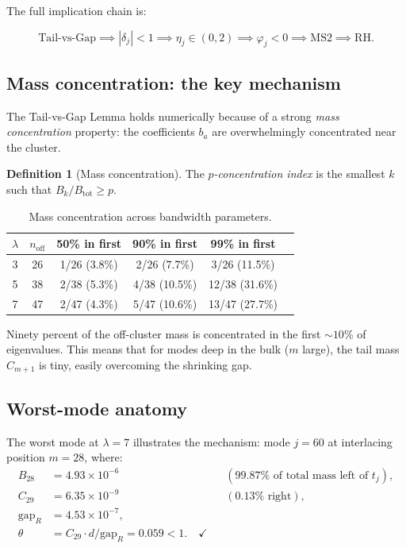\documentclass[12pt,a4paper]{article}
\theoremstyle{definition}
\newtheorem{definition}[theorem]{Definition}
\theoremstyle{remark}
\newcommand{\off}{\mathrm{off}}
\begin{document}
The full implication chain is:

\begin{equation}
\label{eq:chain}
\boxed{
\text{Tail-vs-Gap}
\!\implies\! |\delta_j| < 1
\!\implies\! \eta_j \in (0,2)
\!\implies\! \varphi_j < 0
\!\implies\! \text{MS2}
\!\implies\! \text{RH}.
}
\end{equation}

\subsection{Mass concentration: the key mechanism}

The Tail-vs-Gap Lemma holds numerically because of a strong
\emph{mass concentration} property: the coefficients $b_a$ are
overwhelmingly concentrated near the cluster.

\begin{definition}[Mass concentration]
The \emph{$p$-concentration index} is the smallest $k$ such that
$B_k / B_{\mathrm{tot}} \geq p$.
\end{definition}

\begin{table}[h]
\centering
\caption{Mass concentration across bandwidth parameters.}
\label{tab:mass}
\begin{tabular}{cccccc}
\toprule
$\lambda$ & $n_{\off}$ & 50\% in first & 90\% in first & 99\% in first \\
\midrule
3 & 26 & 1/26 (3.8\%) & 2/26 (7.7\%) & 3/26 (11.5\%) \\
5 & 38 & 2/38 (5.3\%) & 4/38 (10.5\%) & 12/38 (31.6\%) \\
7 & 47 & 2/47 (4.3\%) & 5/47 (10.6\%) & 13/47 (27.7\%) \\
\bottomrule
\end{tabular}
\end{table}

Ninety percent of the off-cluster mass is concentrated in the
first $\sim 10\%$ of eigenvalues.
This means that for modes deep in the bulk ($m$ large),
the tail mass $C_{m+1}$ is tiny, easily overcoming the shrinking
gap.

\subsection{Worst-mode anatomy}

The worst mode at $\lambda = 7$ illustrates the mechanism:
mode $j = 60$ at interlacing position $m = 28$, where:
\begin{align*}
B_{28} &= 4.93 \times 10^{-6} && (99.87\% \text{ of total mass left of } t_j), \\
C_{29} &= 6.35 \times 10^{-9} && (0.13\% \text{ right}), \\
\text{gap}_R &= 4.53 \times 10^{-7}, \\
\theta &= C_{29} \cdot d / \text{gap}_R = 0.059 < 1. \quad \checkmark
\end{align*}
\end{document}
